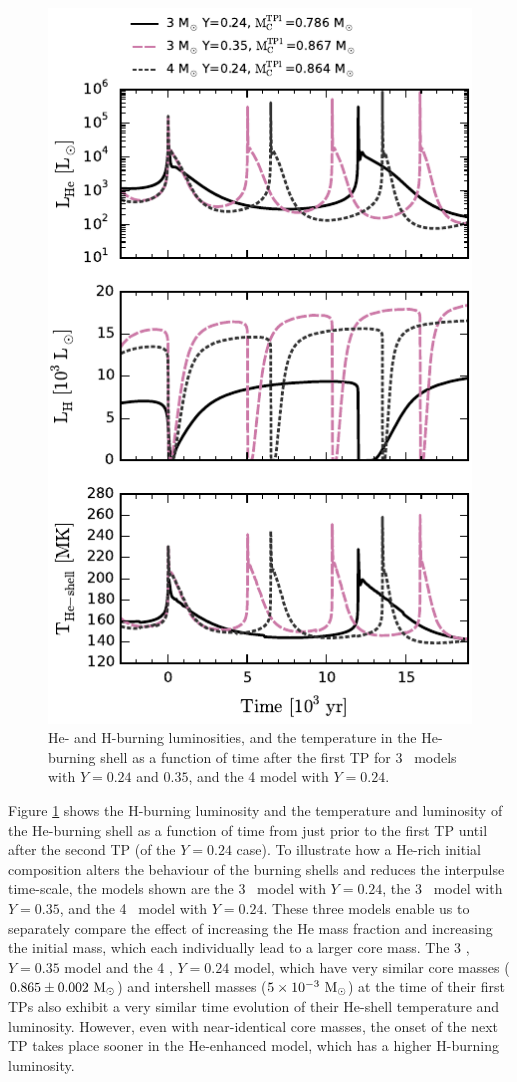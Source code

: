 \begin{figure}
 \begin{center}\includegraphics[height=0.83\textheight]{fig-tp1.pdf}\end{center}
 \caption{He- and H-burning luminosities, and the temperature in the He-burning shell as a function of time after the first TP for 3 \Msun\ models with $Y=0.24$ and $0.35$, and the 4 \Msun model with $Y=0.24$.}\label{fig:tp1}
\end{figure}

Figure \ref{fig:tp1} shows the H-burning luminosity and the temperature and luminosity of the He-burning shell as a function of time from just prior to the first TP until after the second TP (of the $Y=0.24$ case). To illustrate how a He-rich initial composition alters the behaviour of the burning shells and reduces the interpulse time-scale, the models shown are the 3 \Msun\ model with $Y=0.24$, the 3 \Msun\ model with $Y=0.35$, and the 4 \Msun\ model with $Y=0.24$. These three models enable us to separately compare the effect of increasing the He mass fraction and increasing the initial mass, which each individually lead to a larger core mass. The 3 \Msun, $Y=0.35$ model and the 4 \Msun, $Y=0.24$ model, which have very similar core masses ($0.865 \pm 0.002\ \mathrm{M}_{\odot}$) and intershell masses ($5\times10^{-3}\ \mathrm{M}_{\odot}$) at the time of their first TPs also exhibit a very similar time evolution of their He-shell temperature and luminosity. However, even with near-identical core masses, the onset of the next TP takes place sooner in the He-enhanced model, which has a higher H-burning luminosity.


